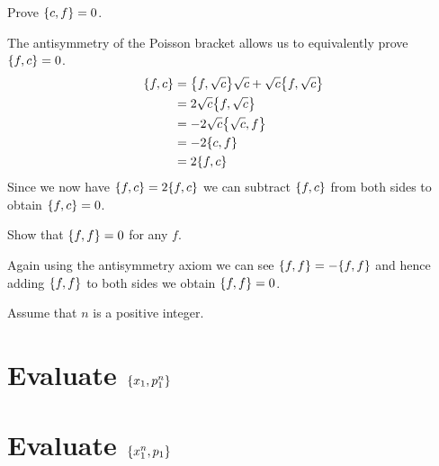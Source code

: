 \documentclass[boxes]{homework}
\makeatletter
\numberwithin{@problem}{section}
\makeatother
\begin{document}
\setcounter{section}{2}

\begin{problem}
Prove $\pb{c}{f} = 0$.
\end{problem}

\begin{solution}
	The antisymmetry of the Poisson bracket allows us to equivalently prove $\pb{f}{c} = 0$.
	\begin{align*}
		\pb{f}{c} & = \pb{f}{\sqrt{c}}\sqrt{c} + \sqrt{c}\pb{f}{\sqrt{c}} \\
		          & = 2\sqrt{c}\pb{f}{\sqrt{c}}                           \\
		          & = -2\sqrt{c}\pb{\sqrt{c}}{f}                          \\
		          & = -2\pb{c}{f}                                         \\
		          & = 2\pb{f}{c}
	\end{align*}
	Since we now have $\pb{f}{c} = 2\pb{f}{c}$ we can subtract $\pb{f}{c}$ from both sides to obtain $\pb{f}{c} = 0$.
\end{solution}

\begin{problem}
Show that $\pb{f}{f} = 0$ for any $f$.
\end{problem}

\begin{solution}
	Again using the antisymmetry axiom we can see $\pb{f}{f} = -\pb{f}{f}$ and hence adding $\pb{f}{f}$ to both sides we obtain $\pb{f}{f} = 0$.
\end{solution}

\begin{problem}
Assume that $n$ is a positive integer.
\begin{parts}
	\part{Evaluate $\pb{x_1}{p_1^n}$}\label{part:3a}
	\part{Evaluate $\pb{x_1^n}{p_1}$}\label{part:3b}
\end{parts}
\end{problem}
\end{document}
